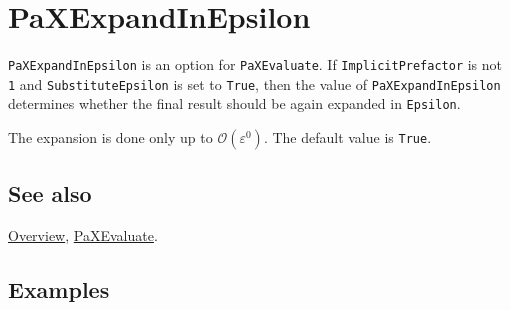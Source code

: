 \documentclass[../FeynHelpersManual.tex]{subfiles}
\begin{document}
\hypertarget{paxexpandinepsilon}{
\section{PaXExpandInEpsilon}\label{paxexpandinepsilon}}

\texttt{PaXExpandInEpsilon} is an option for \texttt{PaXEvaluate}. If
\texttt{ImplicitPrefactor} is not \texttt{1} and
\texttt{SubstituteEpsilon} is set to \texttt{True}, then the value of
\texttt{PaXExpandInEpsilon} determines whether the final result should
be again expanded in \texttt{Epsilon}.

The expansion is done only up to \(\mathcal{O}(\varepsilon^0)\). The
default value is \texttt{True}.

\subsection{See also}

\hyperlink{toc}{Overview}, \hyperlink{paxevaluate}{PaXEvaluate}.

\subsection{Examples}
\end{document}
